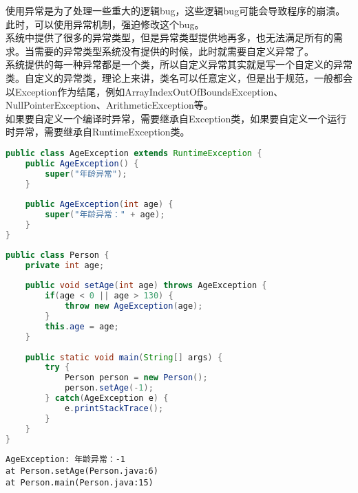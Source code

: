 使用异常是为了处理一些重大的逻辑bug，这些逻辑bug可能会导致程序的崩溃。此时，可以使用异常机制，强迫修改这个bug。\\

系统中提供了很多的异常类型，但是异常类型提供地再多，也无法满足所有的需求。当需要的异常类型系统没有提供的时候，此时就需要自定义异常了。\\

系统提供的每一种异常都是一个类，所以自定义异常其实就是写一个自定义的异常类。自定义的异常类，理论上来讲，类名可以任意定义，但是出于规范，一般都会以Exception作为结尾，例如ArrayIndexOutOfBoundsException、NullPointerException、ArithmeticException等。\\

如果要自定义一个编译时异常，需要继承自Exception类，如果要自定义一个运行时异常，需要继承自RuntimeException类。\\


\begin{lstlisting}[language=Java, title=AgeException.java]
public class AgeException extends RuntimeException {
    public AgeException() {
        super("年龄异常");
    }
    
    public AgeException(int age) {
        super("年龄异常：" + age);
    }
}
\end{lstlisting}

\begin{lstlisting}[language=Java, title=Person.java]
public class Person {
    private int age;
    
    public void setAge(int age) throws AgeException {
        if(age < 0 || age > 130) {
            throw new AgeException(age);
        }
        this.age = age;
    }
    
    public static void main(String[] args) {
        try {
            Person person = new Person();
            person.setAge(-1);
        } catch(AgeException e) {
            e.printStackTrace();
        }
    }
}
\end{lstlisting}

\begin{tcolorbox}
    \begin{verbatim}
AgeException: 年龄异常：-1
at Person.setAge(Person.java:6)
at Person.main(Person.java:15)
	\end{verbatim}
\end{tcolorbox}

\newpage